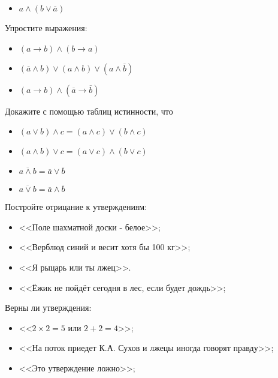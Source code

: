 \documentclass{article}
\begin{document}
\begin{enumerate_boxed}
\begin{itemize}
            \item $a \wedge (b \vee \overline{a})$

        \end{itemize}

        \item Упростите выражения:
        \begin{itemize}

            \item $(a \rightarrow b) \wedge (b \rightarrow a)$

            \item $(\overline{a} \wedge b) \vee  (a \wedge b) \vee  (a \wedge \overline{b})$

            \item $(a \rightarrow b) \wedge (\overline{a} \rightarrow \overline{b})$

        \end{itemize}

        \item Докажите с помощью таблиц истинности, что
        \begin{itemize}

            \item $(a \vee b) \wedge c = (a \wedge c) \vee (b \wedge c)$

            \item  $(a \wedge b) \vee c = (a \vee c) \wedge (b \vee c)$

            \item  $\overline{a \wedge b}= \overline{a} \vee \overline{b}$

            \item  $\overline{a \vee b}= \overline{a} \wedge \overline{b}$

        \end{itemize}

        \item Постройте отрицание к утверждениям:
        \begin{itemize}
            \item <<Поле шахматной доски - белое>>;

            \item <<Верблюд синий и весит хотя бы 100 кг>>;

            \item <<Я рыцарь или ты лжец>>.

            \item <<Ёжик не пойдёт сегодня в лес, если будет дождь>>;
        \end{itemize}

        \item Верны ли утверждения:
        \begin{itemize}
            \item <<$2 \times 2 = 5$ или $2 + 2 = 4$>>;

            \item <<На поток приедет К.А. Сухов и лжецы иногда говорят правду>>;

            \item <<Это утверждение ложно>>;
        \end{itemize}

    \end{enumerate_boxed}
\end{document}
